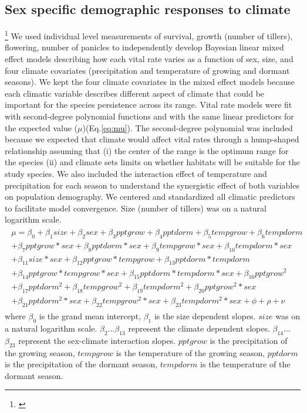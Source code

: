 \documentclass[12pt]{article}
\newcommand{\jacob}[2]{{\color{blue}{#1}}\footnote{\textit{\color{blue}{#2}}}}
\begin{document}
\subsection*{Sex specific demographic responses to climate}
\jacob{}{ I have reduced the redundancy between the two paragraphs and added the biological rationale for the model.  I hope that the explaination I added provided a clarification about why I did not use model selection.}
We used individual level measurements of survival, growth (number of tillers), flowering, number of panicles to independently develop Bayesian linear mixed effect models describing how each vital rate varies as a function of sex, size, and four climate covariates (precipitation and temperature of growing and dormant seasons). 
We kept the four climate covariates in the mixed effect models because each climatic variable describes different aspect of climate that could be important for the species persistence across its range. 
Vital rate models were fit with second-degree polynomial functions and with the same linear predictors for the expected value ($\mu$)(Eq.\ref{eq:mu}).
The second-degree polynomial was included because we expected that climate would affect vital rates through a hump-shaped relationship assuming that (i) the center of the range is the optimum range for the species (ii) and climate sets limits on whether habitats will be suitable for the study species.
We also included the interaction effect of temperature and precipitation for each season to understand the synergistic effect of both variables on population demography. 
We centered and standardized all climatic predictors to facilitate model convergence.
Size (number of tillers) was on a natural logarithm scale. 
\begin{align}\label{eq:mu}
\begin{split}
\mu = \beta_{0} + \beta_{1}size + \beta_{2}sex + \beta_{3}pptgrow + \beta_{4}pptdorm + \beta_{5}tempgrow + \beta_{6}tempdorm \\ 
+ \beta_{7}pptgrow*sex + \beta_{8}pptdorm*sex + \beta_{9}tempgrow*sex + \beta_{10}tempdorm*sex  \\ 
+  \beta_{11}size*sex + \beta_{12}pptgrow*tempgrow + \beta_{13}pptdorm*tempdorm\\
+ \beta_{14}pptgrow*tempgrow*sex + \beta_{15}pptdorm*tempdorm*sex + \beta_{16}pptgrow^2\\
+ \beta_{17}pptdorm^2 + \beta_{18}tempgrow^2 + \beta_{19}tempdorm^2 + \beta_{20}pptgrow^2*sex  \\
+ \beta_{21}pptdorm^2*sex + \beta_{22}tempgrow^2*sex + \beta_{23}tempdorm^2*sex + \phi + \rho + \nu 
\end{split}
\end{align}
\noindent where $\beta_{0}$ is the  grand mean intercept, $\beta_{1}$ is the size dependent slopes.
$size$ was on a natural logarithm scale. 
$\beta_{2}$...$\beta_{13}$ represent the climate dependent slopes.
$\beta_{14}$...$\beta_{23}$ represent the sex-climate interaction slopes.
$pptgrow$ is the precipitation of the growing season, $tempgrow$ is the temperature of the growing season, $pptdorm$ is the precipitation of the dormant season, $tempdorm$ is the temperature of the dormant season.
\end{document}
